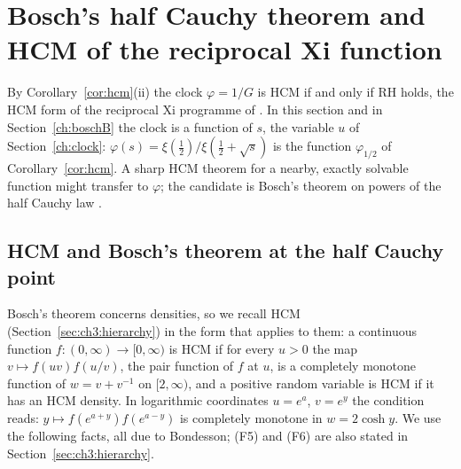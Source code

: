 \section{Bosch's half Cauchy theorem and HCM of the reciprocal Xi function}\label{ch:boschA}

By Corollary~\ref{cor:hcm}(ii) the clock $\varphi=1/G$ is HCM if and only if RH holds, the HCM form of the reciprocal Xi programme of \cite{P17}. In this section and in Section~\ref{ch:boschB} the clock is a function of $s$, the variable $u$ of Section~\ref{ch:clock}: $\varphi(s)=\xi(\frac12)/\xi(\frac12+\sqrt s)$ is the function $\varphi_{1/2}$ of Corollary~\ref{cor:hcm}. A sharp HCM theorem for a nearby, exactly solvable function might transfer to $\varphi$; the candidate is Bosch's theorem on powers of the half Cauchy law \cite{boBosch}.

\subsection{HCM and Bosch's theorem at the half Cauchy point}\label{bh:sec:bosch}

Bosch's theorem concerns densities, so we recall HCM (Section~\ref{sec:ch3:hierarchy}) in the form that applies to them: a continuous function $f:(0,\infty)\to[0,\infty)$ is HCM if for every $u>0$ the map $v\mapsto f(uv)f(u/v)$, the pair function of $f$ at $u$, is a completely monotone function of $w=v+v^{-1}$ on $[2,\infty)$, and a positive random variable is HCM if it has an HCM density. In logarithmic coordinates $u=e^a$, $v=e^y$ the condition reads: $y\mapsto f(e^{a+y})f(e^{a-y})$ is completely monotone in $w=2\cosh y$. We use the following facts, all due to Bondesson; (F5) and (F6) are also stated in Section~\ref{sec:ch3:hierarchy}.


